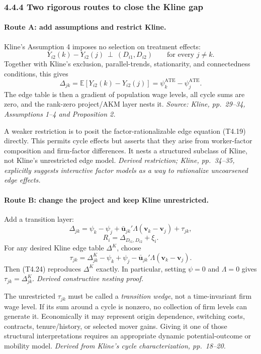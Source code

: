 \documentclass[11pt]{article}
\begin{document}
\subsubsection{4.4.4 Two rigorous routes to close the Kline gap}

\paragraph{Route A: add assumptions and restrict Kline.}
Kline's Assumption 4 imposes no selection on treatment effects:
\[
Y_{i2}(k)-Y_{i2}(j)
\ \perp\
(D_{i1},D_{i2})
\qquad
\text{for every }j\neq k.
\tag{T4.22}
\]
Together with Kline's exclusion, parallel-trends, stationarity, and
connectedness conditions, this gives
\[
\Delta_{jk}
=
\mathbb E[Y_{i2}(k)-Y_{i2}(j)]
=
\psi_k^{\mathrm{ATE}}-\psi_j^{\mathrm{ATE}}.
\tag{T4.23}
\]
The edge table is then a gradient of population wage levels, all cycle sums
are zero, and the rank-zero project/AKM layer nests it.
\textit{Source: Kline, pp.\ 29--34, Assumptions 1--4 and Proposition 2.}

A weaker restriction is to posit the factor-rationalizable edge equation
(T4.19) directly.  This permits cycle effects but asserts that they arise from
worker-factor composition and firm-factor differences.  It nests a structured
subclass of Kline, not Kline's unrestricted edge model.
\textit{Derived restriction; Kline, pp.\ 34--35, explicitly suggests
interactive factor models as a way to rationalize uncoarsened edge effects.}

\paragraph{Route B: change the project and keep Kline unrestricted.}
Add a transition layer:
\[
\Delta_{jk}
=
\psi_k-\psi_j
+\bar{\mathbf u}_{jk}'\Lambda(\mathbf v_k-\mathbf v_j)
+\tau_{jk},
\tag{T4.24}
\]
\[
R_i
=
\Delta_{D_{i1},D_{i2}}+\xi_i.
\tag{T4.25}
\]
For any desired Kline edge table \(\Delta^K\), choose
\[
\tau_{jk}
=
\Delta^K_{jk}
-\psi_k+\psi_j
-\bar{\mathbf u}_{jk}'\Lambda(\mathbf v_k-\mathbf v_j).
\tag{T4.26}
\]
Then (T4.24) reproduces \(\Delta^K\) exactly.  In particular, setting
\(\psi=0\) and \(\Lambda=0\) gives \(\tau_{jk}=\Delta^K_{jk}\).
\textit{Derived constructive nesting proof.}

The unrestricted \(\tau_{jk}\) must be called a \emph{transition wedge}, not
a time-invariant firm wage level.  If its sum around a cycle is nonzero, no
collection of firm levels can generate it.  Economically it may represent
origin dependence, switching costs, contracts, tenure/history, or selected
mover gains.  Giving it one of those structural interpretations requires an
appropriate dynamic potential-outcome or mobility model.
\textit{Derived from Kline's cycle characterization, pp.\ 18--20.}
\end{document}
